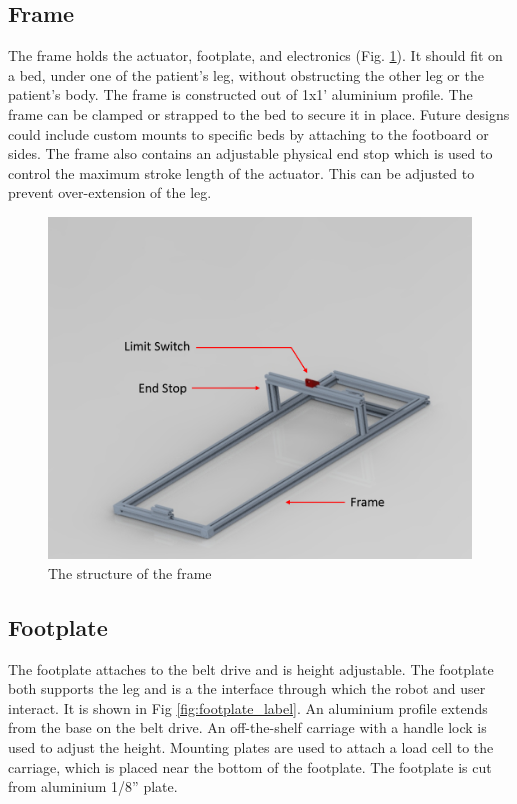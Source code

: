 \documentclass[12pt]{report}
\begin{document}
	\subsection{Frame}

	The frame holds the actuator, footplate, and electronics (Fig. \ref{fig:frame}). It should fit on a bed, under one of the patient's leg, without obstructing the other leg or the patient's body. The frame is constructed out of 1x1' aluminium profile. The frame can be clamped or strapped to the bed to secure it in place. Future designs could include custom mounts to specific beds by attaching to the footboard or sides. The frame also contains an adjustable physical end stop which is used to control the maximum stroke length of the actuator. This can be adjusted to prevent over-extension of the leg.
	

	\begin{figure}[h] 
		\centering
		\includegraphics[width=0.75\linewidth]{frame}
		\caption{The structure of the frame}
		\label{fig:frame}
	\end{figure}
	
	
	
	\subsection{Footplate}
	
	The footplate attaches to the belt drive and is height adjustable. The footplate both supports the leg and is a the interface through which the robot and user interact. It is shown in Fig \ref{fig:footplate_label}. An aluminium profile extends from the base on the belt drive. An off-the-shelf carriage with a handle lock is used to adjust the height. Mounting plates are used to attach a load cell to the carriage, which is placed near the bottom of the footplate. The footplate is cut from aluminium 1/8'' plate. 
	
\end{document}
